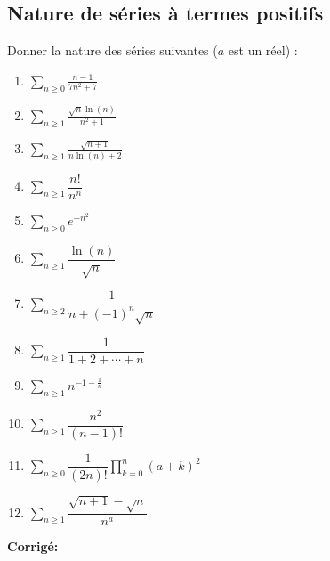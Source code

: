 \documentclass[a4paper,twoside,french,10pt]{VcCours}
\newcommand{\corr}{\textbf{Corrigé:}}
\newcommand{\Sum}[2]{\ensuremath{\textstyle{\sum\limits_{#1}^{#2}}}}
\begin{document}

\tableofcontents
\separationTitre

\bigskip


\subsection{Nature de séries à termes positifs}


\begin{Exercice}{} Donner la nature des séries suivantes ($a$ est un réel) :
\begin{multicols}{3}
\begin{enumerate}
\item $\Sum{n \geq 0}{} \frac{n-1}{7n^2+7}$
\item $\Sum{n \geq 1}{}\frac{\sqrt{n}\ln(n)}{n^2+1}$
\item $\Sum{n \geq 1}{}\frac{\sqrt{n+1}}{n\ln(n)+2}$ 
\item $\Sum{n \geq 1}{} \dfrac{n!}{n^n} $
\columnbreak
\item $\Sum{n \geq 0}{} e^{-n^2} $
\item $\Sum{n \geq 1}{} \dfrac{\ln(n)}{\sqrt{n}} $
\item $\Sum{n \geq 2}{} \dfrac{1}{n+(-1)^n \sqrt{n}} $
\item $\Sum{n \geq 1}{} \dfrac{1}{1+2+ \cdots + n} $
\columnbreak
\item $\Sum{n \geq 1}{} n^{-1- \frac{1}{n}} $
\item $\Sum{n \geq 1}{}  \dfrac{n^2}{(n-1)!} $
\item $\Sum{n \geq 0}{} \dfrac{1}{(2n)!} \prod_{k=0}^n (a+k)^2$ 
\item $\Sum{n \geq 1}{} \dfrac{\sqrt{n+1}-\sqrt{n}}{n^a}$ 
\end{enumerate}
\end{multicols}

\vspace{0.05cm}

\end{Exercice}

\corr 
\end{document}
